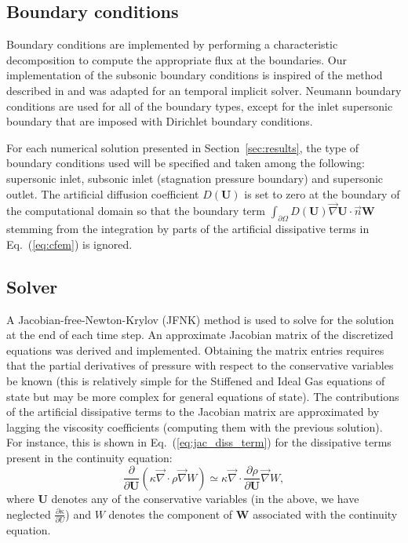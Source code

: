 \documentclass[preprint,10pt]{elsarticle}
\renewcommand{\div}{\vec{\nabla}\! \cdot \!}
\newcommand{\grad}{\vec{\nabla}}
\newcommand{\eqt}[1]{Eq.~(\ref{#1})}                     %
\newcommand{\sct}[1]{Section~\ref{#1}}                   %
\newcommand{\tcr}[1]{\textcolor{red}{#1}}
\newcommand{\tcb}[1]{\textcolor{blue}{#1}}
\begin{document}
\subsection{Boundary conditions} \label{sec:bc}
Boundary conditions are implemented by performing a characteristic decomposition to compute the appropriate flux at the boundaries.
Our implementation of the subsonic boundary conditions is inspired of the method described in \cite{SEM} and was adapted for an temporal implicit solver. Neumann boundary conditions are used for all of the boundary types, except for the inlet supersonic boundary that are imposed with Dirichlet boundary conditions.

For each numerical solution presented in \sct{sec:results}, the type of boundary conditions used will be specified and taken among the following: supersonic inlet, subsonic inlet (stagnation pressure boundary) and supersonic outlet. 
The artificial diffusion coefficient $D(\mathbf  U)$ is set to zero at the boundary of the computational domain so that the boundary term $\int_{\partial \Omega} D(\mathbf  U) \grad \mathbf  U \cdot \vec{n} \mathbf W$ stemming from the integration by parts of the artificial dissipative terms in \eqt{eq:cfem} is ignored.

\subsection{Solver} \label{sec:solver}
A Jacobian-free-Newton-Krylov (JFNK) method is used to solve for the solution at the end of each time step. An approximate Jacobian matrix of the discretized equations was derived and implemented. Obtaining the matrix entries requires that the partial derivatives of pressure with respect to the conservative variables be known (this is relatively simple for the Stiffened and Ideal Gas equations of state but may be more complex for general equations of state). The contributions of the artificial dissipative terms to the Jacobian matrix are approximated by lagging the viscosity coefficients (computing them with the previous solution). For instance, this is shown in \eqt{eq:jac_diss_term} for the dissipative terms present in the continuity equation:
\begin{equation}
\label{eq:jac_diss_term}
\frac{\partial}{\partial \mathbf U} \left( \kappa \div \rho \grad W \right) \simeq \kappa \div \frac{\partial \rho}{\partial \mathbf U} \grad W ,
\end{equation}  
where $\mathbf  U$ denotes any of the conservative variables (in the above, we have neglected $\frac{\partial \kappa}{\partial U} $) and $W$ denotes the component of $\mathbf  W$ associated with the continuity equation.
\end{document}
